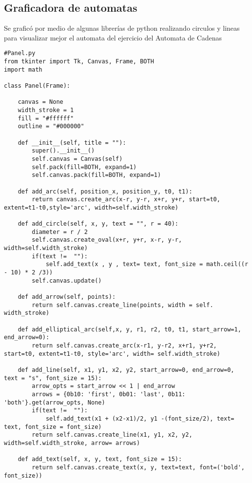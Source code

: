 \documentclass[a4paper]{article}
\begin{document}
            \subsection{Graficadora de automatas}
            Se graficó por medio de algunas librerías de python realizando circulos y lineas para visualizar mejor el automata del ejercicio del Automata de Cadenas
            \begin{lstlisting}
#Panel.py
from tkinter import Tk, Canvas, Frame, BOTH
import math
                
class Panel(Frame):
                
    canvas = None
    width_stroke = 1
    fill = "#ffffff"
    outline = "#000000"

    def __init__(self, title = ""):
        super().__init__()
        self.canvas = Canvas(self)
        self.pack(fill=BOTH, expand=1)
        self.canvas.pack(fill=BOTH, expand=1)
    
    def add_arc(self, position_x, position_y, t0, t1):
        return canvas.create_arc(x-r, y-r, x+r, y+r, start=t0, extent=t1-t0,style='arc', width=self.width_stroke)    

    def add_circle(self, x, y, text = "", r = 40):
        diameter = r / 2
        self.canvas.create_oval(x+r, y+r, x-r, y-r, width=self.width_stroke)
        if(text !=  ""):
            self.add_text(x , y , text= text, font_size = math.ceil((r - 10) * 2 /3))
        self.canvas.update()
    
    def add_arrow(self, points):
        return self.canvas.create_line(points, width = self. width_stroke)
        
    def add_elliptical_arc(self,x, y, r1, r2, t0, t1, start_arrow=1, end_arrow=0):
        return self.canvas.create_arc(x-r1, y-r2, x+r1, y+r2, start=t0, extent=t1-t0, style='arc', width= self.width_stroke)

    def add_line(self, x1, y1, x2, y2, start_arrow=0, end_arrow=0, text = "s", font_size = 15):
        arrow_opts = start_arrow << 1 | end_arrow
        arrows = {0b10: 'first', 0b01: 'last', 0b11: 'both'}.get(arrow_opts, None)
        if(text !=  ""):
            self.add_text(x1 + (x2-x1)/2, y1 -(font_size/2), text= text, font_size = font_size)
        return self.canvas.create_line(x1, y1, x2, y2, width=self.width_stroke, arrow= arrows)

    def add_text(self, x, y, text, font_size = 15):
        return self.canvas.create_text(x, y, text=text, font=('bold', font_size))
        \end{lstlisting}
\end{document}
